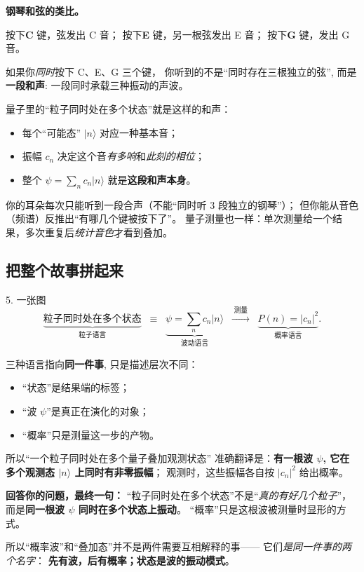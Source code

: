 \documentclass[11pt,a4paper]{ctexart}
\begin{document}
\begin{lifeblock}
\textbf{钢琴和弦的类比。}

按下\textbf{C} 键，弦发出 C 音；
按下\textbf{E} 键，另一根弦发出 E 音；
按下\textbf{G} 键，发出 G 音。
\smallskip

如果你\emph{同时}按下 C、E、G 三个键，
你听到的不是``同时存在三根独立的弦'',
而是\textbf{一段和声}: 一段同时承载三种振动的声波。

\smallskip
量子里的``粒子同时处在多个状态''就是这样的和声：
\begin{itemize}
  \item 每个``可能态'' $\lvert n\rangle$ 对应一种基本音；
  \item 振幅 $c_n$ 决定这个音\emph{有多响}和\emph{此刻的相位}；
  \item 整个 $\psi = \sum_n c_n\lvert n\rangle$ 就是\textbf{这段和声本身}。
\end{itemize}

\smallskip
你的耳朵每次只能听到一段合声（不能``同时听 3 段独立的钢琴''）；
但你能从音色（频谱）反推出``有哪几个键被按下了''。
量子测量也一样：单次测量给一个结果，多次重复后\emph{统计音色}才看到叠加。
\end{lifeblock}

\subsection{把整个故事拼起来}

\begin{stepblock}{5. 一张图}
\[
  \underbrace{\text{粒子同时处在多个状态}}_{\text{粒子语言}}
  \;\;\equiv\;\;
  \underbrace{\psi = \sum_n c_n\lvert n\rangle}_{\text{波动语言}}
  \;\;\xrightarrow{\;\text{测量}\;}\;\;
  \underbrace{P(n)=|c_n|^2}_{\text{概率语言}}.
\]

\smallskip
三种语言指向\textbf{同一件事}, 只是描述层次不同：
\begin{itemize}
  \item ``状态''是结果端的标签；
  \item ``波 $\psi$''是真正在演化的对象；
  \item ``概率''只是测量这一步的产物。
\end{itemize}

\smallskip
所以``一个粒子同时处在多个量子叠加观测状态''
准确翻译是：\textbf{有一根波 $\psi$, 它在多个观测态 $\lvert n\rangle$ 上同时有非零振幅}；
观测时，这些振幅各自按 $|c_n|^2$ 给出概率。
\end{stepblock}

\begin{keypointblock}
\textbf{回答你的问题，最终一句：}
``粒子同时处在多个状态''不是``\emph{真的有好几个粒子}''，
而是\textbf{同一根波 $\psi$ 同时在多个状态上振动}。
``概率''只是这根波被测量时显形的方式。

\smallskip
所以``概率波''和``叠加态''并不是两件需要互相解释的事——
它们\emph{是同一件事的两个名字}：
\textbf{先有波，后有概率；状态是波的振动模式}。
\end{keypointblock}
\end{document}
